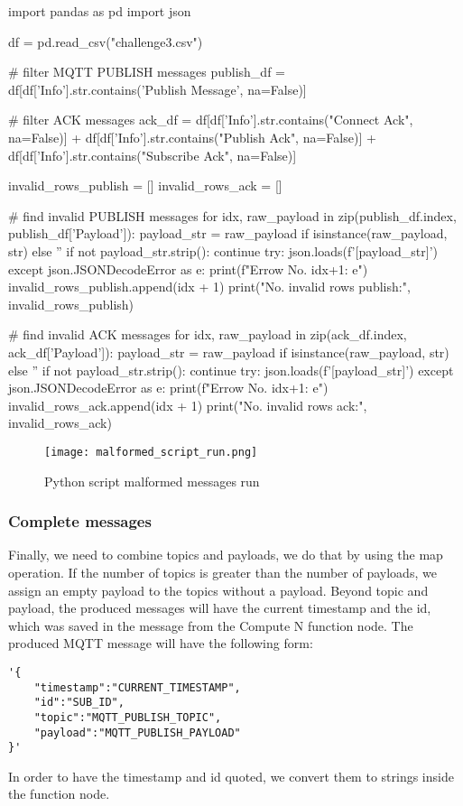 \begin{python}
import pandas as pd
import json 

df = pd.read_csv("challenge3.csv")

# filter MQTT PUBLISH messages 
publish_df = df[df['Info'].str.contains('Publish Message', na=False)]

# filter ACK messages 
ack_df = df[df['Info'].str.contains("Connect Ack", na=False)] + df[df['Info'].str.contains("Publish Ack", na=False)] + df[df['Info'].str.contains("Subscribe Ack", na=False)]

invalid_rows_publish = []
invalid_rows_ack = []

# find invalid PUBLISH messages
for idx, raw_payload in zip(publish_df.index, publish_df['Payload']):
    payload_str = raw_payload if isinstance(raw_payload, str) else ''
    if not payload_str.strip():
        continue
    try:
        json.loads(f'[{payload_str}]')
    except json.JSONDecodeError as e:
        print(f"Errow No. {idx+1}: {e}")
        invalid_rows_publish.append(idx + 1)
print("No. invalid rows publish:", invalid_rows_publish)

# find invalid ACK messages
for idx, raw_payload in zip(ack_df.index, ack_df['Payload']):
    payload_str = raw_payload if isinstance(raw_payload, str) else ''
    if not payload_str.strip():
        continue
    try:
        json.loads(f'[{payload_str}]')
    except json.JSONDecodeError as e:
        print(f"Errow No. {idx+1}: {e}")
        invalid_rows_ack.append(idx + 1)
print("No. invalid rows ack:", invalid_rows_ack)
\end{python}

\begin{figure}[H]
    \centering
    \texttt{[image: malformed\_script\_run.png]}
    \caption{Python script malformed messages run}
\end{figure}

\subsubsection{Complete messages}
Finally, we need to combine topics and payloads, we do that by using the map operation. If the number of topics is greater than the number of payloads, we assign an empty payload to the topics without a payload. Beyond topic and payload, the produced messages will have the current timestamp and the id, which was saved in the message from the Compute N function node.
The produced MQTT message will have the following form:
\begin{verbatim}
'{
    "timestamp":"CURRENT_TIMESTAMP",
    "id":"SUB_ID",
    "topic":"MQTT_PUBLISH_TOPIC",
    "payload":"MQTT_PUBLISH_PAYLOAD"
}'
\end{verbatim}
In order to have the timestamp and id quoted, we convert them to strings inside the function node. 

